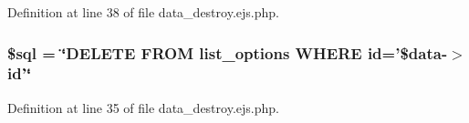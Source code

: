 \-Definition at line 38 of file data\-\_\-destroy.\-ejs.\-php.

\hypertarget{administration_2lists_2data__destroy_8ejs_8php_a047170d6020a882807665812a27e2525}{
\subsubsection[{\$sql}]{\setlength{\rightskip}{0pt plus 5cm}\$sql = \char`\"{}\-D\-E\-L\-E\-T\-E \-F\-R\-O\-M list\-\_\-options \-W\-H\-E\-R\-E id='\$data-\/$>$id'\char`\"{}}}\label{administration_2lists_2data__destroy_8ejs_8php_a047170d6020a882807665812a27e2525}


\-Definition at line 35 of file data\-\_\-destroy.\-ejs.\-php.

